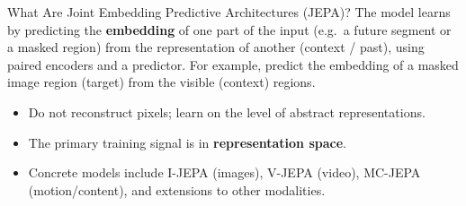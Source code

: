 \begin{frame}{What Are Joint Embedding Predictive Architectures (JEPA)?}
  The model learns by predicting the \textbf{embedding} of one part of the input (e.g.\ a future segment or a masked region) from the representation of another (context / past), using paired encoders and a predictor.
  For example, predict the embedding of a masked image region (target) from the visible (context) regions.
  \begin{itemize}
    \item Do not reconstruct pixels; learn on the level of abstract representations.
    \item The primary training signal is in \textbf{representation space}.
    \item Concrete models include I-JEPA (images), V-JEPA (video), MC-JEPA (motion/content), and extensions to other modalities.
  \end{itemize}
\end{frame}

